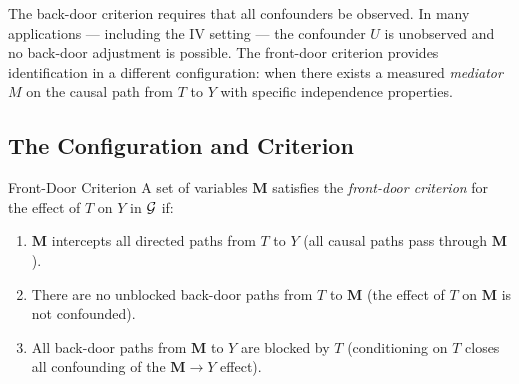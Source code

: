 \documentclass[master.tex]{subfiles}
\begin{document}
The back-door criterion requires that all confounders be observed.  In
many applications --- including the IV setting --- the confounder $U$ is
unobserved and no back-door adjustment is possible.  The front-door
criterion provides identification in a different configuration: when there
exists a measured \emph{mediator} $M$ on the causal path from $T$ to $Y$
with specific independence properties.

\subsection{The Configuration and Criterion}
\label{w3:sec:frontdoor-def}
\begin{defn}{Front-Door Criterion}
\label{w3:def:frontdoor}
A set of variables $\mathbf{M}$ satisfies the \emph{front-door criterion}
for the effect of $T$ on $Y$ in $\mathcal{G}$ if:
\begin{enumerate}
  \item $\mathbf{M}$ intercepts all directed paths from $T$ to $Y$
        (all causal paths pass through $\mathbf{M}$).
  \item There are no unblocked back-door paths from $T$ to $\mathbf{M}$
        (the effect of $T$ on $\mathbf{M}$ is not confounded).
  \item All back-door paths from $\mathbf{M}$ to $Y$ are blocked by $T$
        (conditioning on $T$ closes all confounding of the
        $\mathbf{M} \to Y$ effect).
\end{enumerate}
\end{defn}
\end{document}
